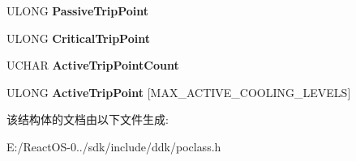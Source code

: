 \begin{DoxyCompactItemize}
U\+L\+O\+NG {\bfseries Passive\+Trip\+Point}
\item 
\mbox{\label{struct___t_h_e_r_m_a_l___i_n_f_o_r_m_a_t_i_o_n_a19a4362a42d23e1057f47b4652b38a62}} 
U\+L\+O\+NG {\bfseries Critical\+Trip\+Point}
\item 
\mbox{\label{struct___t_h_e_r_m_a_l___i_n_f_o_r_m_a_t_i_o_n_af51e15b517677e80a63dad176204a8ae}} 
U\+C\+H\+AR {\bfseries Active\+Trip\+Point\+Count}
\item 
\mbox{\label{struct___t_h_e_r_m_a_l___i_n_f_o_r_m_a_t_i_o_n_ab9dbd221af846951752d7e4112117731}} 
U\+L\+O\+NG {\bfseries Active\+Trip\+Point} \mbox{[}M\+A\+X\+\_\+\+A\+C\+T\+I\+V\+E\+\_\+\+C\+O\+O\+L\+I\+N\+G\+\_\+\+L\+E\+V\+E\+LS\mbox{]}
\end{DoxyCompactItemize}


该结构体的文档由以下文件生成\+:\begin{DoxyCompactItemize}
\item 
E\+:/\+React\+O\+S-\/0../sdk/include/ddk/poclass.\+h\end{DoxyCompactItemize}
